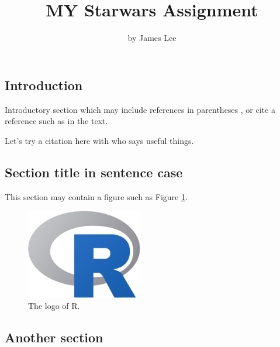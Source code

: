 \title{MY Starwars Assignment}
\author{by James Lee}

\maketitle


\hypertarget{introduction}{%
\subsection{Introduction}\label{introduction}}

Introductory section which may include references in parentheses
\citep{R}, or cite a reference such as \citet{R} in the text.

Let's try a citation here with \citet{barba2018terminologies} who says
useful things.

\hypertarget{section-title-in-sentence-case}{%
\subsection{Section title in sentence
case}\label{section-title-in-sentence-case}}

This section may contain a figure such as Figure \ref{fig:Rlogo}.

\begin{Schunk}
\begin{figure}[htbp]

{\centering \includegraphics[width=2in]{Rlogo} 

}

\caption[The logo of R]{The logo of R.}\label{fig:Rlogo}
\end{figure}
\end{Schunk}

\hypertarget{another-section}{%
\subsection{Another section}\label{another-section}}

